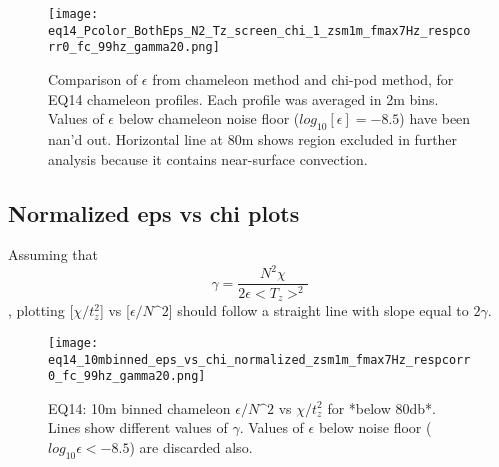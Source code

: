 \documentclass[11pt]{article}
\begin{document}
\begin{figure}[htbp]
\texttt{[image: eq14\_Pcolor\_BothEps\_N2\_Tz\_screen\_chi\_1\_zsm1m\_fmax7Hz\_respcorr0\_fc\_99hz\_gamma20.png]}
\caption{Comparison of $\epsilon$ from chameleon method and chi-pod method, for EQ14 chameleon profiles. Each profile was averaged in 2m bins.  Values of $\epsilon$ below chameleon noise floor ($log_{10}[\epsilon]=-8.5$) have been nan'd out. Horizontal line at 80m shows region excluded in further analysis because it contains near-surface convection.}
\label{eps_overview}
\end{figure}





%    





\clearpage
\subsection{Normalized eps vs chi plots}

Assuming that
\begin{equation}
\gamma=\frac{N^2 \chi}{2\epsilon<T_z>^2}
\end{equation}
, plotting [$\chi/t_{z}^{2}$] vs [$\epsilon/N\^2$] should follow a straight line with slope equal to $2\gamma$.


\begin{figure}[htbp]
\texttt{[image: eq14\_10mbinned\_eps\_vs\_chi\_normalized\_zsm1m\_fmax7Hz\_respcorr0\_fc\_99hz\_gamma20.png]}
\caption{EQ14: 10m binned  chameleon $\epsilon/N\^2$ vs $\chi/t_{z}^{2}$ for *below 80db*. Lines show different values of $\gamma$. Values of $\epsilon$ below noise floor ($log_{10}\epsilon<-8.5$) are discarded also.}
\label{}
\end{figure}
\end{document}
